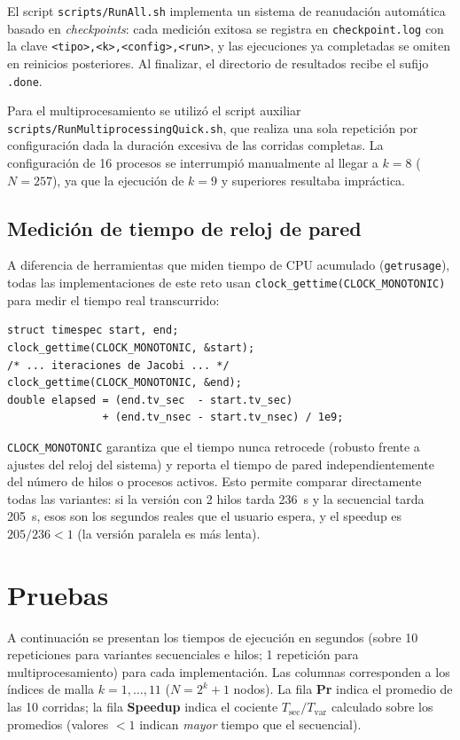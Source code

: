 \documentclass{article}
\begin{document}
El script \texttt{scripts/RunAll.sh} implementa un sistema de reanudación
automática basado en \emph{checkpoints}: cada medición exitosa se registra en
\texttt{checkpoint.log} con la clave \texttt{<tipo>,<k>,<config>,<run>}, y las
ejecuciones ya completadas se omiten en reinicios posteriores.  Al finalizar, el
directorio de resultados recibe el sufijo \texttt{.done}.

Para el multiprocesamiento se utilizó el script auxiliar
\texttt{scripts/RunMultiprocessingQuick.sh}, que realiza una sola repetición por
configuración dada la duración excesiva de las corridas completas.  La
configuración de 16 procesos se interrumpió manualmente al llegar a $k=8$ ($N=257$), ya que la ejecución de $k=9$ y superiores resultaba impráctica.

\subsection{Medición de tiempo de reloj de pared}

A diferencia de herramientas que miden tiempo de CPU acumulado
(\texttt{getrusage}), todas las implementaciones de este reto usan
\texttt{clock\_gettime(CLOCK\_MONOTONIC)} para medir el tiempo real transcurrido:

\begin{verbatim}
struct timespec start, end;
clock_gettime(CLOCK_MONOTONIC, &start);
/* ... iteraciones de Jacobi ... */
clock_gettime(CLOCK_MONOTONIC, &end);
double elapsed = (end.tv_sec  - start.tv_sec)
               + (end.tv_nsec - start.tv_nsec) / 1e9;
\end{verbatim}

\texttt{CLOCK\_MONOTONIC} garantiza que el tiempo nunca retrocede (robusto frente
a ajustes del reloj del sistema) y reporta el tiempo de pared independientemente
del número de hilos o procesos activos.  Esto permite comparar directamente
todas las variantes: si la versión con 2 hilos tarda 236~s y la secuencial
tarda 205~s, esos son los segundos reales que el usuario espera, y el speedup
es $205/236 < 1$ (la versión paralela es más lenta).

\section{Pruebas}

A continuación se presentan los tiempos de ejecución en segundos (sobre 10
repeticiones para variantes secuenciales e hilos; 1 repetición para
multiprocesamiento) para cada implementación.  Las columnas corresponden a los
índices de malla $k=1,\ldots,11$ ($N = 2^k+1$ nodos).  La fila
\textbf{Pr} indica el promedio de las 10 corridas; la fila
\textbf{Speedup} indica el cociente $T_{\text{sec}} / T_{\text{var}}$ calculado
sobre los promedios (valores $<1$ indican \emph{mayor} tiempo que el secuencial).
\end{document}
